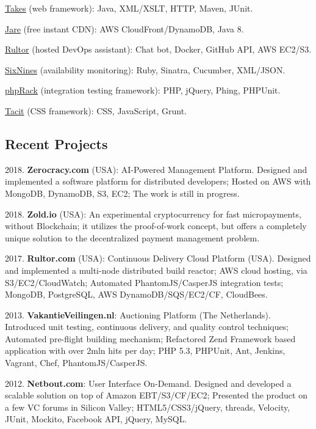 \documentclass[12pt]{article}
\begin{document}
\href{https://www.takes.org}{Takes} (web framework):
Java, XML/XSLT, HTTP, Maven, JUnit.

\href{https://www.jare.io}{Jare} (free instant CDN):
AWS CloudFront/DynamoDB, Java 8.

\href{https://www.rultor.com}{Rultor} (hosted DevOps assistant):
Chat bot, Docker, GitHub API, AWS EC2/S3.

\href{https://www.sixnines.io}{SixNines} (availability monitoring):
Ruby, Sinatra, Cucumber, XML/JSON.

\href{https://www.phprack.com}{phpRack} (integration testing framework):
PHP, jQuery, Phing, PHPUnit.

\href{https://github.com/yegor256/tacit}{Tacit} (CSS framework):
CSS, JavaScript, Grunt.

\subsection*{Recent Projects}

2018. \textbf{Zerocracy.com} (USA): AI-Powered Management Platform.
Designed and implemented a software platform for distributed developers;
Hosted on AWS with MongoDB, DynamoDB, S3, EC2;
The work is still in progress.

2018. \textbf{Zold.io} (USA): An experimental cryptocurrency for
fast micropayments, without Blockchain; it utilizes the proof-of-work
concept, but offers a completely unique solution to the decentralized
payment management problem.

2017. \textbf{Rultor.com} (USA): Continuous Delivery Cloud Platform (USA).
Designed and implemented a multi-node distributed build reactor;
AWS cloud hosting, via S3/EC2/CloudWatch;
Automated PhantomJS/CasperJS integration tests;
MongoDB, PostgreSQL, AWS DynamoDB/SQS/EC2/CF, CloudBees.

2013. \textbf{VakantieVeilingen.nl}: Auctioning Platform (The Netherlands).
Introduced unit testing, continuous delivery, and quality control techniques;
Automated pre-flight building mechanism;
Refactored Zend Framework based application with over 2mln hits per day;
PHP 5.3, PHPUnit, Ant, Jenkins, Vagrant, Chef, PhantomJS/CasperJS.

2012. \textbf{Netbout.com}: User Interface On-Demand.
Designed and developed a scalable solution on top of Amazon EBT/S3/CF/EC2;
Presented the product on a few VC forums in Silicon Valley;
HTML5/CSS3/jQuery, threads, Velocity, JUnit, Mockito, Facebook API, jQuery, MySQL.
\end{document}
